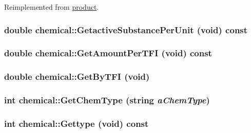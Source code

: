 Reimplemented from \hyperlink{classproduct_a18a1df87f3400774db21d1e8c573f04a}{product}.\hypertarget{classchemical_a084ecbb27d06ec9559e4c3592f99f2d6}{
\subsubsection[{GetactiveSubstancePerUnit}]{\setlength{\rightskip}{0pt plus 5cm}double chemical::GetactiveSubstancePerUnit (void) const}}
\label{classchemical_a084ecbb27d06ec9559e4c3592f99f2d6}
\hypertarget{classchemical_aefba936b8096f1c54f497d743befa4bf}{
\subsubsection[{GetAmountPerTFI}]{\setlength{\rightskip}{0pt plus 5cm}double chemical::GetAmountPerTFI (void) const}}
\label{classchemical_aefba936b8096f1c54f497d743befa4bf}
\hypertarget{classchemical_aa62a63c584384fa781c473897889ee05}{
\subsubsection[{GetByTFI}]{\setlength{\rightskip}{0pt plus 5cm}double chemical::GetByTFI (void)}}
\label{classchemical_aa62a63c584384fa781c473897889ee05}
\hypertarget{classchemical_a15170334ac60dc36dc9d94c6463f3874}{
\subsubsection[{GetChemType}]{\setlength{\rightskip}{0pt plus 5cm}int chemical::GetChemType (string {\em aChemType})}}
\label{classchemical_a15170334ac60dc36dc9d94c6463f3874}
\hypertarget{classchemical_ae66c160476435100ad1596cf55553073}{
\subsubsection[{Gettype}]{\setlength{\rightskip}{0pt plus 5cm}int chemical::Gettype (void) const}}

